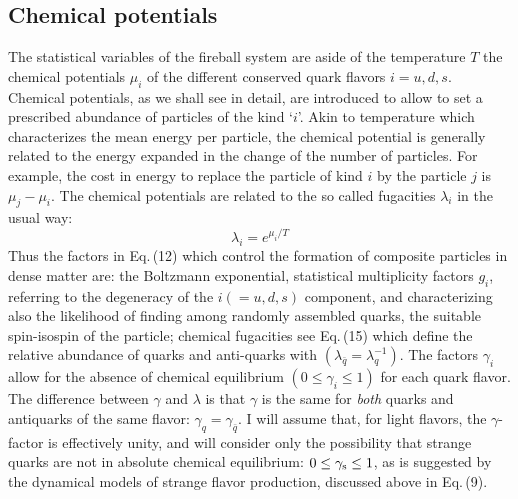 \begin{mdframed}[linecolor=gray,roundcorner=12pt,backgroundcolor=Dandelion!15,linewidth=1pt,leftmargin=0cm,rightmargin=0cm,topline=true,bottomline=true,skipabove=12pt]
\subsection*{Chemical potentials} 
The statistical variables of the fireball system are aside of the
temperature $T$ the chemical potentials $\mu_i$ of the different
conserved quark flavors $i=u,d,s$. Chemical potentials, as we shall see
in detail, are introduced to allow to set a prescribed abundance of
particles of the kind `$i$'. Akin to temperature which characterizes the
mean energy per particle, the chemical potential is generally related to
the energy expanded in the change of the number of particles. For
example, the cost in energy to replace the particle of kind $i$ by the
particle $j$ is $\mu_j-\mu_i$. The chemical potentials are related to the
so called fugacities $\lambda_i$ in the usual way:
\begin{equation}
\tag{15} \lambda_i=e^{\mu_i/T}
\end{equation} 
Thus the factors in Eq.\,(12) which control the formation of
composite particles in dense matter are: the Boltzmann exponential,
statistical multiplicity factors $g_i$, referring to the degeneracy of
the $i(=u,d,s)$ component, and characterizing also the likelihood of
finding among randomly assembled quarks, the suitable spin-isospin of the
particle; chemical fugacities see Eq.\,(15) which define the
relative abundance of quarks and anti-quarks with $(\lambda_{\bar q} =
\lambda_q^{-1})$. The factors $\gamma_i$ allow for the absence of
chemical equilibrium $(0 \le \gamma_i \le 1)$ for each quark flavor. The
difference between $\gamma$ and $\lambda$ is that $\gamma$ is the same
for {\it both} quarks and antiquarks of the same flavor:
$\gamma_q=\gamma_{\bar q}$. I will assume that, for light flavors, the
$\gamma$-factor is effectively unity, and will consider only the
possibility that strange quarks are not in absolute chemical equilibrium:
$0\le\gamma_{\rm s}\le1$, as is suggested by the dynamical models of
strange flavor production, discussed above in Eq.\,(9).
 

\end{mdframed}
